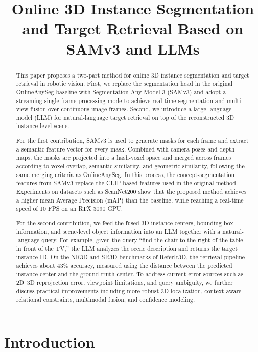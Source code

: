 \documentclass[12pt,a4paper]{article}
\title{Online 3D Instance Segmentation and Target Retrieval Based on SAMv3 and LLMs}
\author{}
\date{}
\begin{document}
\maketitle

\begin{abstract}
This paper proposes a two-part method for online 3D instance segmentation and target retrieval in robotic vision. First, we replace the segmentation head in the original OnlineAnySeg baseline with Segmentation Any Model 3 (SAMv3) and adopt a streaming single-frame processing mode to achieve real-time segmentation and multi-view fusion over continuous image frames. Second, we introduce a large language model (LLM) for natural-language target retrieval on top of the reconstructed 3D instance-level scene.

For the first contribution, SAMv3 is used to generate masks for each frame and extract a semantic feature vector for every mask. Combined with camera poses and depth maps, the masks are projected into a hash-voxel space and merged across frames according to voxel overlap, semantic similarity, and geometric similarity, following the same merging criteria as OnlineAnySeg. In this process, the concept-segmentation features from SAMv3 replace the CLIP-based features used in the original method. Experiments on datasets such as ScanNet200 show that the proposed method achieves a higher mean Average Precision (mAP) than the baseline, while reaching a real-time speed of 10 FPS on an RTX 3090 GPU.

For the second contribution, we feed the fused 3D instance centers, bounding-box information, and scene-level object information into an LLM together with a natural-language query. For example, given the query ``find the chair to the right of the table in front of the TV,'' the LLM analyzes the scene description and returns the target instance ID. On the NR3D and SR3D benchmarks of ReferIt3D, the retrieval pipeline achieves about 43\% accuracy, measured using the distance between the predicted instance center and the ground-truth center. To address current error sources such as 2D--3D reprojection error, viewpoint limitations, and query ambiguity, we further discuss practical improvements including more robust 3D localization, context-aware relational constraints, multimodal fusion, and confidence modeling.
\end{abstract}

\section{Introduction}
\end{document}

